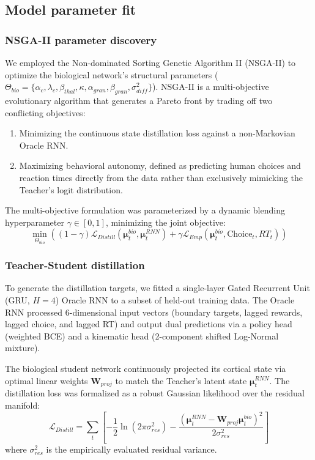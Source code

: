 \documentclass[12pt, a4paper]{extarticle}
\begin{document}
	\subsection{Model parameter fit}
	
	\subsubsection{NSGA-II parameter discovery}
	We employed the Non-dominated Sorting Genetic Algorithm II (NSGA-II) \parencite{deb2002fast} to optimize the biological network's structural parameters ($\Theta_{bio} = \{\alpha_c, \lambda_c, \beta_{thal}, \kappa, \alpha_{gran}, \beta_{gran}, \sigma_{diff}^2\}$). NSGA-II is a multi-objective evolutionary algorithm that generates a Pareto front by trading off two conflicting objectives:
	\begin{enumerate}
		\item Minimizing the continuous state distillation loss against a non-Markovian Oracle RNN.
		\item Maximizing behavioral autonomy, defined as predicting human choices and reaction times directly from the data rather than exclusively mimicking the Teacher's logit distribution.
	\end{enumerate}
	The multi-objective formulation was parameterized by a dynamic blending hyperparameter $\gamma \in [0, 1]$, minimizing the joint objective:
	\begin{equation}
		\min_{\Theta_{bio}} \left( (1-\gamma)\mathcal{L}_{Distill}(\boldsymbol{\mu}_t^{bio}, \boldsymbol{\mu}_t^{RNN}) + \gamma \mathcal{L}_{Emp}(\boldsymbol{\mu}_t^{bio}, \text{Choice}_t, RT_t) \right)
	\end{equation}
	
	\subsubsection{Teacher-Student distillation}
	To generate the distillation targets, we fitted a single-layer Gated Recurrent Unit (GRU, $H=4$) Oracle RNN to a subset of held-out training data. The Oracle RNN processed 6-dimensional input vectors (boundary targets, lagged rewards, lagged choice, and lagged RT) and output dual predictions via a policy head (weighted BCE) and a kinematic head (2-component shifted Log-Normal mixture). 
	
	The biological student network continuously projected its cortical state via optimal linear weights $\mathbf{W}_{proj}$ to match the Teacher's latent state $\boldsymbol{\mu}_t^{RNN}$. The distillation loss was formalized as a robust Gaussian likelihood over the residual manifold:
	\begin{equation}
		\mathcal{L}_{Distill} = \sum_{t} \left[ -\frac{1}{2}\ln(2\pi\sigma_{res}^2) - \frac{(\boldsymbol{\mu}_t^{RNN} - \mathbf{W}_{proj}\boldsymbol{\mu}_t^{bio})^2}{2\sigma_{res}^2} \right]
	\end{equation}
	where $\sigma_{res}^2$ is the empirically evaluated residual variance.
	
\end{document}
